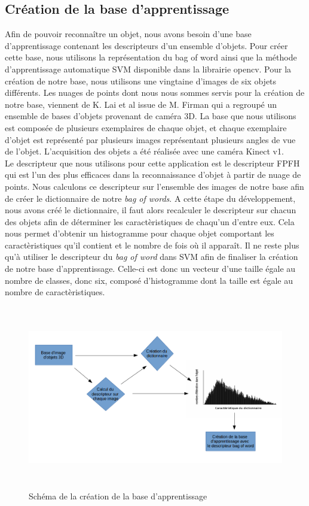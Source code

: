 \subsection{Création de la base d'apprentissage}
Afin de pouvoir reconnaître un objet, nous avons besoin d'une base d'apprentissage contenant les descripteurs d'un ensemble
d'objets. Pour créer cette base, nous utilisons la représentation du \og bag of word \fg ainsi que la méthode d'apprentissage 
automatique SVM\cite{SVM} disponible dans la librairie opencv. Pour la création de notre base, nous utilisons une vingtaine
d'images de six objets différents. Les nuages de points dont nous nous sommes servis pour la création de notre base, viennent de 
K. Lai et al\cite{Base1} issue de M. Firman\cite{generalBase} qui a regroupé un ensemble de bases d'objets provenant de caméra 3D.
La base que nous utilisons est composée de plusieurs exemplaires de chaque objet, et chaque exemplaire d'objet est représenté par 
plusieurs images représentant plusieurs angles de vue de l'objet. L'acquisition des objets a été réalisée avec une caméra 
Kinect v1.\\

Le descripteur que nous utilisons pour cette application est le descripteur FPFH\cite{FPFH} qui est l'un des plus efficaces dans la
reconnaissance d'objet à partir de nuage de points. Nous calculons ce descripteur sur l'ensemble des images de notre base afin de
créer le dictionnaire de notre \textit{bag of words}. A cette étape du développement, nous avons créé le dictionnaire, il faut
alors recalculer le descripteur sur chacun des objets afin de déterminer les caractèristiques de chaqu'un d'entre eux. Cela nous
permet d'obtenir un histogramme pour chaque objet comportant les caractèristiques qu'il contient et le nombre de fois où il
apparaît. Il ne reste plus qu'à utiliser le descripteur du \textit{bag of word} dans SVM afin de finaliser la création de 
notre base d'apprentissage. Celle-ci est donc un vecteur d'une taille égale au nombre de classes, donc six, 
composé d'histogramme dont la taille est égale au nombre de caractèristiques.\\

\begin{figure}[!ht]
  \begin{center}
    \includegraphics[height=8cm]{image/schemaBase.png}
    \caption{Schéma de la création de la base d'apprentissage}
  \end{center}
\end{figure}

